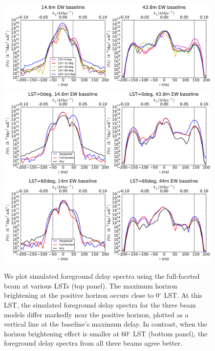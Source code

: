 \begin{figure}[h]
\centering
\includegraphics[width=6in]{chap3_hera_beammapping/nithya_fg_pspec_all_lst.pdf}
\includegraphics[width=6in]{chap3_hera_beammapping/nithya_fg_pspec_lst0deg.pdf}
\includegraphics[width=6in]{chap3_hera_beammapping/nithya_fg_pspec_lst60deg.pdf}
\caption[We plot simulated foreground delay spectra using the full-faceted beam at various LSTs (top panel).]{We plot simulated foreground delay spectra using the full-faceted beam at various LSTs (top panel). The maximum horizon brightening at the positive horizon occurs close to 0$^\circ$ LST. At this LST, the simulated foreground delay spectra for the three beam models differ markedly near the positive horizon, plotted as a vertical line at the baseline's maximum delay. In contrast, when the horizon brightening effect is smaller at 60$^\circ$ LST (bottom panel), the foreground delay spectra from all three beams agree better.}
\label{fig:delayspec}
\end{figure}

